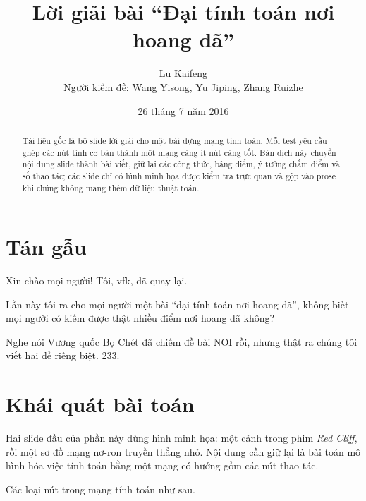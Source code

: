 \documentclass[11pt]{article}
\title{Lời giải bài ``Đại tính toán nơi hoang dã''}
\author{Lu Kaifeng\\Người kiểm đề: Wang Yisong, Yu Jiping, Zhang Ruizhe}
\date{26 tháng 7 năm 2016}
\begin{document}
\maketitle


\begin{abstract}
Tài liệu gốc là bộ slide lời giải cho một bài dựng mạng tính toán. Mỗi test
yêu cầu ghép các nút tính cơ bản thành một mạng càng ít nút càng tốt. Bản
dịch này chuyển nội dung slide thành bài viết, giữ lại các công thức, bảng
điểm, ý tưởng chấm điểm và số thao tác; các slide chỉ có hình minh họa được
kiểm tra trực quan và gộp vào prose khi chúng không mang thêm dữ liệu thuật
toán.
\end{abstract}

\tableofcontents

\section{Tán gẫu}

Xin chào mọi người! Tôi, vfk, đã quay lại.

Lần này tôi ra cho mọi người một bài ``đại tính toán nơi hoang dã'', không
biết mọi người có kiếm được thật nhiều điểm nơi hoang dã không?

Nghe nói Vương quốc Bọ Chét đã chiếm đề bài NOI rồi, nhưng thật ra chúng tôi
viết hai đề riêng biệt. 233.

\section{Khái quát bài toán}

Hai slide đầu của phần này dùng hình minh họa: một cảnh trong phim
\textit{Red Cliff}, rồi một sơ đồ mạng nơ-ron truyền thẳng nhỏ. Nội dung cần
giữ lại là bài toán mô hình hóa việc tính toán bằng một mạng có hướng gồm
các nút thao tác.

Các loại nút trong mạng tính toán như sau.
\end{document}
